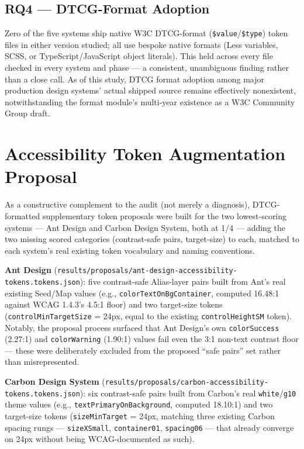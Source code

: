 \documentclass[11pt]{article}
\begin{document}
\subsection{RQ4 --- DTCG-Format Adoption}

Zero of the five systems ship native W3C DTCG-format (\texttt{\$value}/\texttt{\$type}) token files in either version studied; all use bespoke native formats (Less variables, SCSS, or TypeScript/JavaScript object literals). This held across every file checked in every system and phase --- a consistent, unambiguous finding rather than a close call. As of this study, DTCG format adoption among major production design systems' actual shipped source remains effectively nonexistent, notwithstanding the format module's multi-year existence as a W3C Community Group draft.

\section{Accessibility Token Augmentation Proposal}

As a constructive complement to the audit (not merely a diagnosis), DTCG-formatted supplementary token proposals were built for the two lowest-scoring systems --- Ant Design and Carbon Design System, both at 1/4 --- adding the two missing scored categories (contrast-safe pairs, target-size) to each, matched to each system's real existing token vocabulary and naming conventions.

\textbf{Ant Design} (\texttt{results/proposals/ant-design-accessibility-tokens.tokens.json}): five contrast-safe Alias-layer pairs built from Ant's real existing Seed/Map values (e.g., \texttt{colorTextOnBgContainer}, computed 16.48:1 against WCAG 1.4.3's 4.5:1 floor) and two target-size tokens (\texttt{controlMinTargetSize} = 24px, equal to the existing \texttt{controlHeightSM} token). Notably, the proposal process surfaced that Ant Design's own \texttt{colorSuccess} (2.27:1) and \texttt{colorWarning} (1.90:1) values fail even the 3:1 non-text contrast floor --- these were deliberately excluded from the proposed ``safe pairs'' set rather than misrepresented.

\textbf{Carbon Design System} (\texttt{results/proposals/carbon-accessibility-tokens.tokens.json}): six contrast-safe pairs built from Carbon's real \texttt{white}/\texttt{g10} theme values (e.g., \texttt{textPrimaryOnBackground}, computed 18.10:1) and two target-size tokens (\texttt{sizeMinTarget} = 24px, matching three existing Carbon spacing rungs --- \texttt{sizeXSmall}, \texttt{container01}, \texttt{spacing06} --- that already converge on 24px without being WCAG-documented as such).
\end{document}
